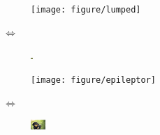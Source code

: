 \begin{figure}[ht]
  \centering
  \begin{subfigure}[c]{0.4\textwidth}
    \texttt{[image: figure/lumped]}
    \caption{}
    \label{fig:lumped}
  \end{subfigure} $\iff$
  \begin{subfigure}[c]{0.4\textwidth}
    \includegraphics[width=\textwidth]{figure/bland}
    \caption{}
    \label{fig:bland}
  \end{subfigure}

  \begin{subfigure}[c]{0.4\textwidth}
    \texttt{[image: figure/epileptor]}
    \caption{}
    \label{fig:epileptor}
  \end{subfigure} $\iff$
  \begin{subfigure}[c]{0.4\textwidth}
    \includegraphics[width=\textwidth]{figure/midres}
    \caption{}
    \label{fig:midres}
  \end{subfigure}


\end{figure}
